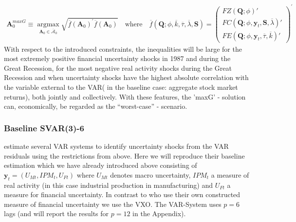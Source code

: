 \documentclass[a4paper,11pt,listof=nochaptergap,oneside,pointednumbers,bibtotoc,bigheadings,liststotoc]{scrbook}
\theoremstyle{mysatz}
\theoremstyle{mydefinition}
\theoremstyle{mybemerkung}
\renewcommand*{\paragraph}[1]{\subsubsection*{#1} \vspace{-3mm}} %
\newcommand{\vect}[1]{\boldsymbol{\mathbf{#1}}}
\begin{document}
\begin{equation} \label{eq:svar_ludvi16}
\begin{split}
\vect{A}_0^{maxG} \equiv \operatorname*{argmax}_{\vect{A}_0 \in \overline{\vect{\mathcal{A}}}_0} \sqrt{\overline{f}(\vect{A}_0)^'\overline{f}(\vect{A}_0)} \quad \text{where} \quad \overline{f}(\vect{Q}; \phi, \overline{k}, \overline{\tau}, \overline{\lambda}, \vect{S}) = \begin{pmatrix}
			FZ(\vect{Q}; \phi)' \\
			FC(\vect{Q}; \phi, \vect{y}_t, \vect{S}, \overline{\lambda})' \\
			FE(\vect{Q}; \phi, \vect{y}_t, \overline{\tau}, \overline{k})'	
		\end{pmatrix}^'
\end{split}								
\end{equation}
With respect to the introduced constraints, the inequalities will be large for the most extremely positive financial uncertainty shocks in 1987 and during the Great Recession, for the most negative real activity shocks during the Great Recession and when uncertainty shocks have the highest absolute correlation with the variable external to the VAR( in the baseline case: aggregate stock market returns), both jointly and collectively. With these features, the 'maxG' - solution can, economically, be regarded as the ``worst-case'' - scenario.

\paragraph{Baseline SVAR(3)-6}
\citet{ludvigsonetal:18} estimate several VAR systems to identify uncertainty shocks from the VAR residuals using the restrictions from above. Here we will reproduce their baseline estimation which we have already introduced above consisting of $\vect{y}_t = (U_{Mt}, IPM_{t}, U_{Ft})$ where $U_{Mt}$ denotes macro uncertainty, $IPM_{t}$ a measure of real activity (in this case industrial production in manufacturing) and $U_{Ft}$ a measure for financial uncertainty. In contrast to \citet{ludvigsonetal:18} who use their own constructed measure of financial uncertainty we use the VXO. The VAR-System uses $p=6$ lags (and will report the results for $p=12$ in the Appendix).
\end{document}
